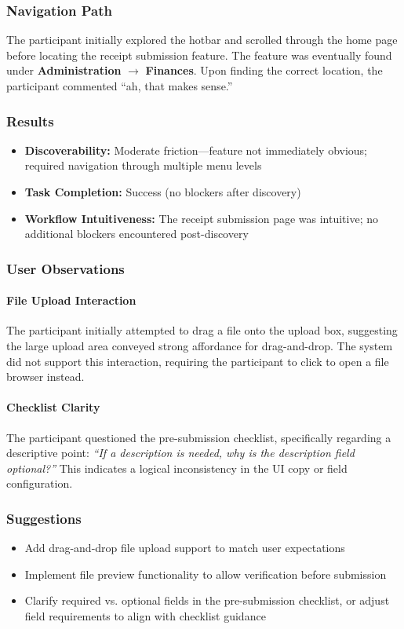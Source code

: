 \documentclass[12pt, titlepage]{article}
\begin{document}
\subsubsection{Navigation Path}
The participant initially explored the hotbar and scrolled through the home page before locating the receipt submission feature. The feature was eventually found under \textbf{Administration} \(\rightarrow\) \textbf{Finances}. Upon finding the correct location, the participant commented ``ah, that makes sense.''

\subsubsection{Results}
\begin{itemize}
    \item \textbf{Discoverability:} Moderate friction—feature not immediately obvious; required navigation through multiple menu levels
    \item \textbf{Task Completion:} Success (no blockers after discovery)
    \item \textbf{Workflow Intuitiveness:} The receipt submission page was intuitive; no additional blockers encountered post-discovery
\end{itemize}

\subsubsection{User Observations}

\paragraph{File Upload Interaction}
The participant initially attempted to drag a file onto the upload box, suggesting the large upload area conveyed strong affordance for drag-and-drop. The system did not support this interaction, requiring the participant to click to open a file browser instead.

\paragraph{Checklist Clarity}
The participant questioned the pre-submission checklist, specifically regarding a descriptive point: \textit{``If a description is needed, why is the description field optional?''} This indicates a logical inconsistency in the UI copy or field configuration.

\subsubsection{Suggestions}
\begin{itemize}
    \item Add drag-and-drop file upload support to match user expectations
    \item Implement file preview functionality to allow verification before submission
    \item Clarify required vs. optional fields in the pre-submission checklist, or adjust field requirements to align with checklist guidance
\end{itemize}
\end{document}
